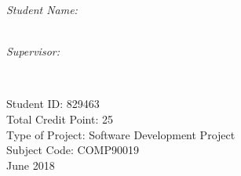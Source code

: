 \documentclass[
11pt, %
oneside, %
english, %
singlespacing, %
headsepline, %
chapterinoneline, %
consistentlayout, %
]{MastersDoctoralThesis} %
\begin{document}
\begin{titlepage}
\begin{center}
\begin{minipage}[t]{0.4\textwidth}
\begin{flushleft} \large
\emph{Student Name:}\\
\href{http://sankholin.com}{\authorname}\\
\end{flushleft}
\end{minipage}
\begin{minipage}[t]{0.4\textwidth}
\begin{flushright} \large
\emph{Supervisor:} \\
\href{https://cis.unimelb.edu.au/people/staff.php?person_ID=342078}{\supname} %
\end{flushright}
\end{minipage}\\[3cm]
 
\vfill

Student ID: 829463\\
Total Credit Point: 25\\
Type of Project: Software Development Project\\
Subject Code: COMP90019\\
June 2018\\[0.4cm]


\HRule \\
\groupname\\\deptname\\\facname\\[2cm] %
 
\vfill

 
\vfill
\end{center}
\end{titlepage}

\end{document}

